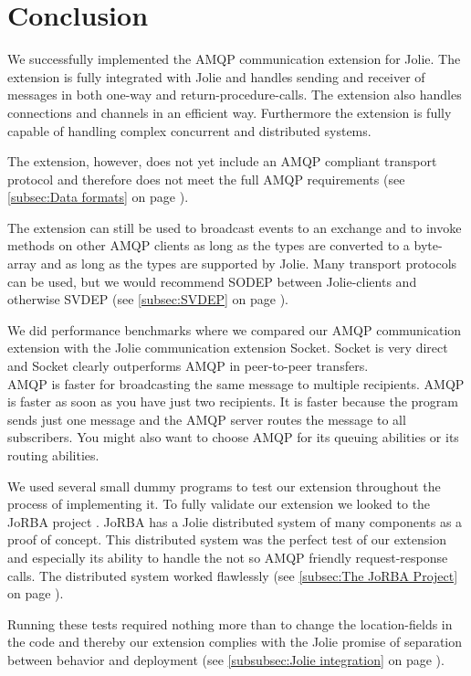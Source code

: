 \section{Conclusion}
We successfully implemented the AMQP communication extension for Jolie. The extension is fully integrated with Jolie and handles sending and receiver of messages in both one-way and return-procedure-calls. The extension also handles connections and channels in an efficient way. Furthermore the extension is fully capable of handling complex concurrent and distributed systems.

The extension, however, does not yet include an AMQP compliant transport protocol and therefore does not meet the full AMQP requirements (see \ref{subsec:Data formats} on page \pageref{subsec:Data formats}).

The extension can still be used to broadcast events to an exchange and to invoke methods on other AMQP clients as long as the types are converted to a byte-array and as long as the types are supported by Jolie. Many transport protocols can be used, but we would recommend SODEP between Jolie-clients and otherwise SVDEP (see \ref{subsec:SVDEP} on page \pageref{subsec:SVDEP}).

We did performance benchmarks where we compared our AMQP communication extension with the Jolie communication extension Socket. Socket is very direct and Socket clearly outperforms AMQP in peer-to-peer transfers.\\
AMQP is faster for broadcasting the same message to multiple recipients. AMQP is faster as soon as you have just two recipients. It is faster because the program sends just one message and the AMQP server routes the message to all subscribers. You might also want to choose AMQP for its queuing abilities or its routing abilities.

We used several small dummy programs to test our extension throughout the process of implementing it. To fully validate our extension we looked to the JoRBA project \cite{Jorba}. JoRBA has a Jolie distributed system of many components as a proof of concept. This distributed system was the perfect test of our extension and especially its ability to handle the not so AMQP friendly request-response calls. The distributed system worked flawlessly (see \ref{subsec:The JoRBA Project} on page \pageref{subsec:The JoRBA Project}).

Running these tests required nothing more than to change the location-fields in the code and thereby our extension complies with the Jolie promise of separation between behavior and deployment (see \ref{subsubsec:Jolie integration} on page \pageref{subsubsec:Jolie integration}).
